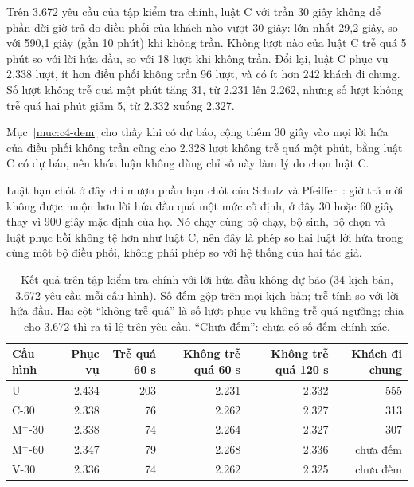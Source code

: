 Trên 3.672 yêu cầu của tập kiểm tra chính, luật C với trần 30 giây không để phần dời giờ trả do điều phối của khách
nào vượt 30 giây: lớn nhất 29,2 giây, so với 590,1 giây (gần 10 phút) khi không trần. Không lượt nào của luật C trễ
quá 5 phút so với lời hứa đầu, so với 18 lượt khi không trần. Đổi lại, luật C phục vụ 2.338 lượt, ít hơn điều phối
không trần 96 lượt, và có ít hơn 242 khách đi chung. Số lượt không trễ quá một phút tăng 31, từ 2.231 lên 2.262,
nhưng số lượt không trễ quá hai phút giảm 5, từ 2.332 xuống 2.327.

Mục~\ref{muc:c4-dem} cho thấy khi có dự báo, cộng thêm 30 giây vào mọi lời hứa của điều phối không trần cũng cho
2.328 lượt không trễ quá một phút, bằng luật C có dự báo, nên khóa luận không dùng chỉ số này làm lý do chọn luật C.

Luật hạn chót ở đây chỉ mượn phần hạn chót của Schulz và Pfeiffer~\cite{schulz2026}: giờ trả mới không được muộn hơn
lời hứa đầu quá một mức cố định, ở đây 30 hoặc 60 giây thay vì 900 giây mặc định của họ. Nó chạy cùng bộ chạy, bộ
sinh, bộ chọn và luật phục hồi không tệ hơn như luật C, nên đây là phép so hai luật lời hứa trong cùng một bộ điều
phối, không phải phép so với hệ thống của hai tác giả.

\begin{table}[htbp]
\centering
\caption{Kết quả trên tập kiểm tra chính với lời hứa đầu không dự báo (34 kịch bản, 3.672 yêu cầu mỗi
cấu hình). Số đếm gộp trên mọi kịch bản; trễ tính so với lời hứa đầu. Hai cột ``không trễ quá'' là số lượt phục vụ
không trễ quá ngưỡng; chia cho 3.672 thì ra tỉ lệ trên yêu cầu. ``Chưa đếm'': chưa có số đếm chính xác.}
\label{bang:c4-chinh}
\small
\begin{tabular}{@{}lrrrrr@{}}
\toprule
\textbf{Cấu hình} & \textbf{Phục vụ} & \textbf{Trễ quá 60 s} & \textbf{Không trễ quá 60 s} &
\textbf{Không trễ quá 120 s} & \textbf{Khách đi chung}\\
\midrule
U & 2.434 & 203 & 2.231 & 2.332 & 555\\
C-30 & 2.338 & 76 & 2.262 & 2.327 & 313\\
M$^{+}$-30 & 2.338 & 74 & 2.264 & 2.327 & 307\\
M$^{+}$-60 & 2.347 & 79 & 2.268 & 2.336 & chưa đếm\\
V-30 & 2.336 & 74 & 2.262 & 2.325 & chưa đếm\\
\bottomrule
\end{tabular}
\end{table}

